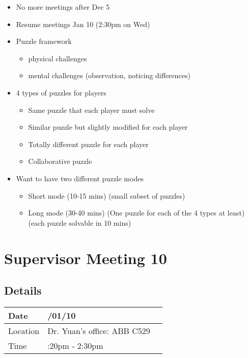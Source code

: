 \documentclass{article}
\begin{document}
\begin{itemize}
    \item No more meetings after Dec 5
    \item Resume meetings Jan 10 (2:30pm on Wed)
    \item Puzzle framework
    \begin{itemize}
        \item physical challenges
        \item mental challenges (observation, noticing differences)
    \end{itemize}
    \item 4 types of puzzles for players
    \begin{itemize}
        \item Same puzzle that each player must solve
        \item Similar puzzle but slightly modified for each player
        \item Totally different puzzle for each player
        \item Collaborative puzzle
    \end{itemize}
    \item Want to have two different puzzle modes
        \begin{itemize}
            \item Short mode (10-15 mins) (small subset of puzzles)
            \item Long mode (30-40 mins) (One puzzle for each of the 4 types at least) (each puzzle solvable in 10 mins)
        \end{itemize}
\end{itemize}

\pagebreak

\section*{Supervisor Meeting 10}

\subsection*{Details}

\begin{tabularx}{0.8\textwidth} { 
  | >{\raggedright\arraybackslash}X 
  | >{\centering\arraybackslash}X 
  | >{\raggedleft\arraybackslash}X | }
 \hline
 Date & 2023/01/10  \\
 \hline
 Location  & Dr. Yuan's office: ABB C529  \\
\hline
Time  & 2:20pm - 2:30pm  \\
\hline
\end{tabularx}
\end{document}
